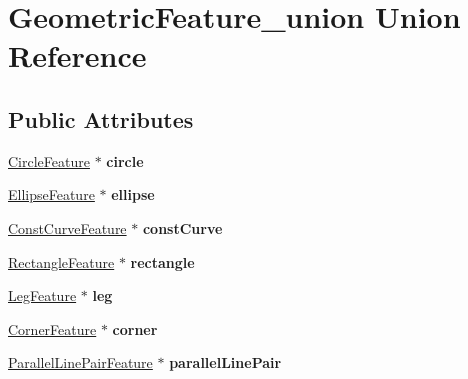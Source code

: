\hypertarget{unionGeometricFeature__union}{
\section{GeometricFeature\_\-union Union Reference}
\label{unionGeometricFeature__union}
}
\subsection*{Public Attributes}
\begin{DoxyCompactItemize}
\item 
\hypertarget{unionGeometricFeature__union_a7b409522fc217ba0b354b36da85608cc}{
\hyperlink{structCircleFeature__struct}{CircleFeature} $\ast$ {\bfseries circle}}
\label{unionGeometricFeature__union_a7b409522fc217ba0b354b36da85608cc}

\item 
\hypertarget{unionGeometricFeature__union_aeb13857f88933f516a01736af5c92f0c}{
\hyperlink{structEllipseFeature__struct}{EllipseFeature} $\ast$ {\bfseries ellipse}}
\label{unionGeometricFeature__union_aeb13857f88933f516a01736af5c92f0c}

\item 
\hypertarget{unionGeometricFeature__union_a04dc7f093427b1726f45e884d0bd8cd8}{
\hyperlink{structConstCurveFeature__struct}{ConstCurveFeature} $\ast$ {\bfseries constCurve}}
\label{unionGeometricFeature__union_a04dc7f093427b1726f45e884d0bd8cd8}

\item 
\hypertarget{unionGeometricFeature__union_a318cf9cf8acc86b912cf1aaae63ff995}{
\hyperlink{structRectangleFeature__struct}{RectangleFeature} $\ast$ {\bfseries rectangle}}
\label{unionGeometricFeature__union_a318cf9cf8acc86b912cf1aaae63ff995}

\item 
\hypertarget{unionGeometricFeature__union_a91d7f78a623fca92170f96a0c516837c}{
\hyperlink{structLegFeature__struct}{LegFeature} $\ast$ {\bfseries leg}}
\label{unionGeometricFeature__union_a91d7f78a623fca92170f96a0c516837c}

\item 
\hypertarget{unionGeometricFeature__union_a44bd117e2ac1fad760964828939e9755}{
\hyperlink{structCornerFeature__struct}{CornerFeature} $\ast$ {\bfseries corner}}
\label{unionGeometricFeature__union_a44bd117e2ac1fad760964828939e9755}

\item 
\hypertarget{unionGeometricFeature__union_a972965ccf25813be69d8c37572f3ddf6}{
\hyperlink{structParallelLinePairFeature__struct}{ParallelLinePairFeature} $\ast$ {\bfseries parallelLinePair}}
\label{unionGeometricFeature__union_a972965ccf25813be69d8c37572f3ddf6}


\end{DoxyCompactItemize}
